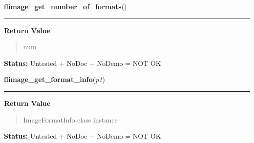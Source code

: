     \label{xformslib:flflimage:flimage_get_number_of_formats}

    \vspace{0.5ex}

\hspace{.8\funcindent}\begin{boxedminipage}{\funcwidth}

    \raggedright \textbf{flimage\_get\_number\_of\_formats}()

    \vspace{-1.5ex}

    \rule{\textwidth}{0.5\fboxrule}
\setlength{\parskip}{2ex}
\setlength{\parskip}{1ex}
      \textbf{Return Value}
    \vspace{-1ex}

      \begin{quote}
      num

      \end{quote}

\textbf{Status:} Untested + NoDoc + NoDemo = NOT OK



    \end{boxedminipage}

    \label{xformslib:flflimage:flimage_get_format_info}

    \vspace{0.5ex}

\hspace{.8\funcindent}\begin{boxedminipage}{\funcwidth}

    \raggedright \textbf{flimage\_get\_format\_info}(\textit{p1})

    \vspace{-1.5ex}

    \rule{\textwidth}{0.5\fboxrule}
\setlength{\parskip}{2ex}
\setlength{\parskip}{1ex}
      \textbf{Return Value}
    \vspace{-1ex}

      \begin{quote}
      ImageFormatInfo class instance

      \end{quote}

\textbf{Status:} Untested + NoDoc + NoDemo = NOT OK



    \end{boxedminipage}

